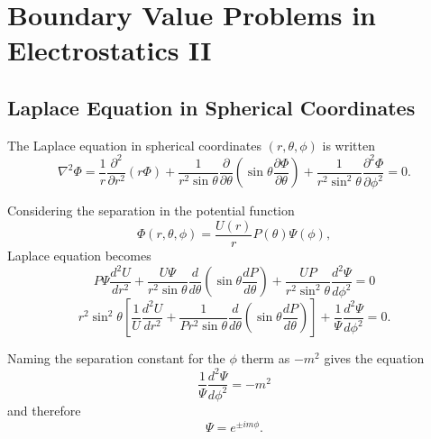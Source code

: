 \chapter{Boundary Value Problems in Electrostatics II} 

\section{Laplace Equation in Spherical Coordinates}
The Laplace equation in spherical coordinates $(r, \theta, \phi)$ is written
\begin{equation}
\nabla^2 \Phi = \frac{1}{r} \frac{\partial^2}{\partial r^2} \left( r \Phi \right) + \frac{1}{r^2 \sin \theta} \frac{\partial}{\partial \theta} \left( \sin \theta \frac{\partial \Phi}{\partial \theta} \right)+ \frac{1}{r^2 \sin^2 \theta} \frac{\partial ^2 \Phi}{\partial \phi ^2} = 0.
\end{equation}

Considering the separation in the potential function
\begin{equation}
\Phi(r, \theta, \phi) = \frac{U(r)}{r} P (\theta) \Psi (\phi),
\end{equation}
Laplace equation becomes
\begin{equation}
P \Psi \frac{d^2 U}{dr^2} + \frac{U\Psi}{r^2 \sin \theta} \frac{d}{d\theta} \left( \sin \theta \frac{dP}{d\theta} \right) + \frac{UP}{r^2 \sin^2 \theta} \frac{d^2 \Psi}{d\phi^2} = 0
\end{equation}
\begin{equation}
r^2 \sin^2 \theta \left[ \frac{1}{U} \frac{d^2 U}{dr^2} + \frac{1}{P r^2 \sin \theta} \frac{d}{d\theta} \left( \sin \theta \frac{dP}{d\theta} \right)\right] + \frac{1}{\Psi} \frac{d^2 \Psi}{d\phi^2} = 0.
\end{equation}

Naming the separation constant for the $\phi$ therm as $-m^2$ gives the equation
\begin{equation}
 \frac{1}{\Psi} \frac{d^2 \Psi}{d\phi^2} = -m^2
\end{equation}
and therefore
\begin{equation}
\Psi = e^{\pm im\phi}.
\end{equation}

